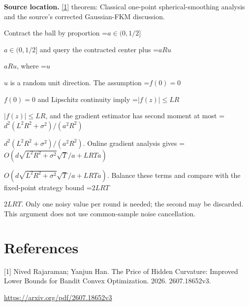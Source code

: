 \documentclass[10pt,a4paper]{article}
\newcommand{\AtlasMath}[1]{\par\begingroup\centering\setbox0=\hbox{$\displaystyle #1$}\ifdim\wd0>1.4\linewidth\typeout{ATLAS WIDE FORMULA: \the\wd0}\fi\ifdim\wd0>\linewidth\resizebox{\linewidth}{!}{\box0}\else\box0\fi\par\endgroup}
\newcommand{\AtlasInlineMath}[1]{\begingroup\setbox0=\hbox{$#1$}\ifdim\wd0>.4\linewidth\endgroup\AtlasMath{#1}\else\endgroup$#1$\fi}
\begin{document}
\textbf{Source location.} \href{https://arxiv.org/pdf/2607.18652v3}{[1]} theorem: Classical one-point spherical-smoothing analysis and the source's corrected Gaussian-FKM discussion.

Contract the ball by proportion \AtlasInlineMath{a\in(0,1/2]} and query the contracted center plus \AtlasInlineMath{aRu}, where \AtlasInlineMath{u} is a random unit direction. The assumption \AtlasInlineMath{f(0)=0} and Lipschitz continuity imply \AtlasInlineMath{|f(z)|\le LR}, and the gradient estimator has second moment at most \AtlasInlineMath{d^2(L^2R^2+\sigma^2)/(a^2R^2)}. Online gradient analysis gives \AtlasInlineMath{O(d\sqrt{L^2R^2+\sigma^2}\sqrt T/a+LRTa)}. Balance these terms and compare with the fixed-point strategy bound \AtlasInlineMath{2LRT}. Only one noisy value per round is needed; the second may be discarded. This argument does not use common-sample noise cancellation.

\section{References}
[1] Nived Rajaraman; Yanjun Han. The Price of Hidden Curvature: Improved Lower Bounds for Bandit Convex Optimization. 2026. 2607.18652v3.

\url{https://arxiv.org/pdf/2607.18652v3}
\end{document}
